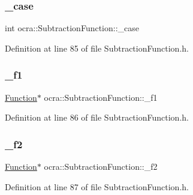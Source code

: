 \subsubsection{\texorpdfstring{\+\_\+case}{\_case}}
{\footnotesize\ttfamily int ocra\+::\+Subtraction\+Function\+::\+\_\+case\hspace{0.3cm}{\ttfamily [protected]}}



Definition at line 85 of file Subtraction\+Function.\+h.

\hypertarget{classocra_1_1SubtractionFunction_a9adc6a235a48bdf90fe1ad4d4a18b7a0}{}\label{classocra_1_1SubtractionFunction_a9adc6a235a48bdf90fe1ad4d4a18b7a0} 
\subsubsection{\texorpdfstring{\+\_\+f1}{\_f1}}
{\footnotesize\ttfamily \hyperlink{classocra_1_1Function}{Function}$\ast$ ocra\+::\+Subtraction\+Function\+::\+\_\+f1\hspace{0.3cm}{\ttfamily [protected]}}



Definition at line 86 of file Subtraction\+Function.\+h.

\hypertarget{classocra_1_1SubtractionFunction_a22e626b681ffd6b9dd90ec4189ad431c}{}\label{classocra_1_1SubtractionFunction_a22e626b681ffd6b9dd90ec4189ad431c} 
\subsubsection{\texorpdfstring{\+\_\+f2}{\_f2}}
{\footnotesize\ttfamily \hyperlink{classocra_1_1Function}{Function}$\ast$ ocra\+::\+Subtraction\+Function\+::\+\_\+f2\hspace{0.3cm}{\ttfamily [protected]}}



Definition at line 87 of file Subtraction\+Function.\+h.

\hypertarget{classocra_1_1SubtractionFunction_a802ca5db967765779131701423f1b207}{}\label{classocra_1_1SubtractionFunction_a802ca5db967765779131701423f1b207} 

